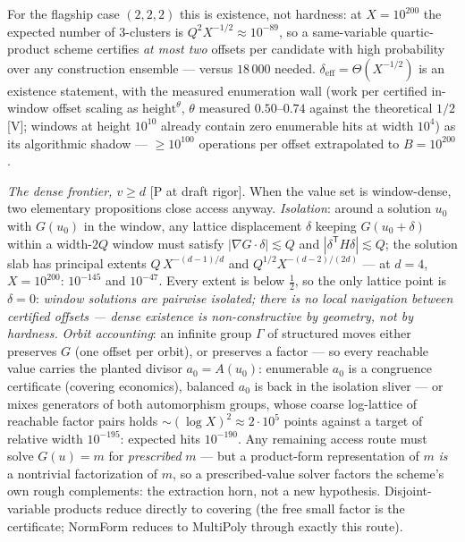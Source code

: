 For the flagship case $(2,2,2)$ this is existence, not hardness: at
$X=10^{200}$ the expected number of 3-clusters is
$Q^2X^{-1/2}\approx10^{-89}$, so a same-variable quartic-product scheme
certifies \emph{at most two} offsets per candidate with high
probability over any construction ensemble --- versus $18\,000$ needed.
$\delta_{\mathrm{eff}}=\Theta(X^{-1/2})$ is an existence statement,
with the measured enumeration wall (work per certified in-window offset
scaling as $\mathrm{height}^{\theta}$, $\theta$ measured
$0.50$--$0.74$ against the theoretical $1/2$ [V]; windows at height
$10^{10}$ already contain zero enumerable hits at width $10^4$) as its
algorithmic shadow --- $\ge10^{100}$ operations per offset extrapolated
to $B=10^{200}$.

\emph{The dense frontier, $v\ge d$} [P at draft rigor]. When the value
set is window-dense, two elementary propositions close access anyway.
\emph{Isolation}: around a solution $u_0$ with $G(u_0)$ in the window,
any lattice displacement $\delta$ keeping $G(u_0+\delta)$ within a
width-$2Q$ window must satisfy $|\nabla G\cdot\delta|\lesssim Q$ and
$|\delta^{\mathsf T}H\delta|\lesssim Q$; the solution slab has
principal extents $Q\,X^{-(d-1)/d}$ and $Q^{1/2}X^{-(d-2)/(2d)}$ ---
at $d=4$, $X=10^{200}$: $10^{-145}$ and $10^{-47}$. Every extent is
below $\tfrac12$, so the only lattice point is $\delta=0$:
\emph{window solutions are pairwise isolated; there is no local
navigation between certified offsets --- dense existence is
non-constructive by geometry, not by hardness.} \emph{Orbit
accounting}: an infinite group $\Gamma$ of structured moves either
preserves $G$ (one offset per orbit), or preserves a factor --- so every
reachable value carries the planted divisor $a_0=A(u_0)$: enumerable
$a_0$ is a congruence certificate (covering economics), balanced $a_0$
is back in the isolation sliver --- or mixes generators of both
automorphism groups, whose coarse log-lattice of reachable factor pairs
holds $\sim(\log X)^2\approx2\cdot10^5$ points against a target of
relative width $10^{-195}$: expected hits $10^{-190}$. Any remaining
access route must solve $G(u)=m$ for \emph{prescribed} $m$ --- but a
product-form representation of $m$ \emph{is} a nontrivial factorization
of $m$, so a prescribed-value solver factors the scheme's own rough
complements: the extraction horn, not a new hypothesis. Disjoint-variable
products reduce directly to covering (the free small factor is the
certificate; \textsf{NormForm} reduces to \textsf{MultiPoly} through
exactly this route).

